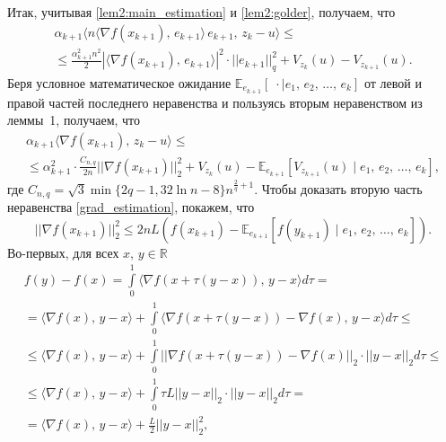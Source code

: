\documentclass[11pt]{article}
\newcommand{\E}{\mathbb{E}}
\newcommand{\RR}{\mathbb{R}}
\begin{document}
		Итак, учитывая \eqref{lem2:main_estimation} и \eqref{lem2:golder}, получаем, что
		\begin{equation*}
			\begin{array}{rl}
				\alpha_{k+1}\langle n \langle \nabla f(x_{k+1}), \, e_{k+1}\rangle \, e_{k+1}, \, z_{k}-u\rangle\leqslant\\
				\leqslant \frac{\alpha_{k+1}^2n^2}{2} |\langle \nabla f(x_{k+1}), \, e_{k+1}\rangle|^2 \cdot ||e_{k+1}||_q^2 + V_{z_k}(u) - V_{z_{k+1}}(u).
			\end{array}
		\end{equation*}
		Беря условное математическое ожидание $\E_{e_{k+1}}[\;\cdot\mid e_1, \, e_2, \, \ldots, \, e_k]$ от левой и правой частей последнего неравенства и пользуясь вторым неравенством из леммы~1, получаем, что
		\begin{equation*}
			\begin{array}{l}
				\alpha_{k+1}\langle \nabla f(x_{k+1}), \, z_{k}-u\rangle\leqslant\\ \leqslant
				\alpha_{k+1}^2\cdot\frac{C_{n,q}}{2n}||\nabla f(x_{k+1})||_2^2 + V_{z_k}(u) - \E_{e_{k+1}}[V_{z_{k+1}}(u)\mid e_1, \, e_2, \, \ldots, \, e_k],
			\end{array}
		\end{equation*}
		где $C_{n,q} {=} \sqrt{3}\min\{2q-1,32\ln n -8\}n^{\frac{2}{q}+1}$. Чтобы доказать вторую часть неравенства \eqref{grad_estimation}, покажем, что
		\begin{equation}\label{lem2:grad_estim}
			||\nabla f(x_{k+1})||_2^2 \leqslant 2nL\left(f(x_{k+1})-\E_{e_{k+1}} \left [f(y_{k+1})\mid e_1, \, e_2, \, \ldots, \, e_k \right ]\right).
		\end{equation}
		Во-первых, для всех $x, \, y\in\RR$
		\begin{equation*}
			\begin{array}{rl}
				f(y) - f(x) = \int\limits_{0}^{1}\langle \nabla f(x+\tau(y-x)), \, y-x\rangle d\tau=\\
				= \langle\nabla f(x), \, y-x\rangle + \int\limits_{0}^{1}\langle \nabla f(x+\tau(y-x))-\nabla f(x), \, y-x\rangle d\tau\leqslant\\
				\leqslant \langle\nabla f(x), \, y-x\rangle + \int\limits_{0}^{1}||\nabla f(x+\tau(y-x))-\nabla f(x)||_2\cdot||y-x||_2d\tau\leqslant\\
				\leqslant \langle\nabla f(x), \, y-x\rangle + \int\limits_{0}^{1}\tau L||y-x||_2\cdot||y-x||_2d\tau=\\
				= \langle\nabla f(x), \, y-x\rangle + \frac{L}{2}||y-x||_2^2,
			\end{array}
		\end{equation*}
\end{document}
